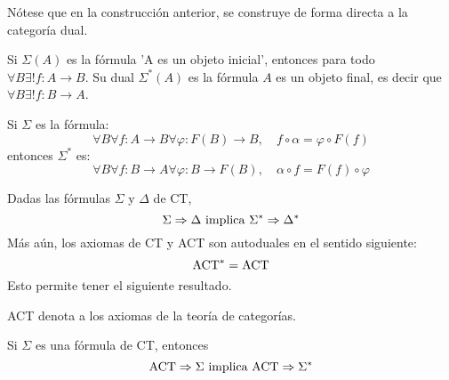 \documentclass[12pt]{report}
\theoremstyle{largebreak}
\newcommand\cf[3]{\ensuremath{#1:#2\rightarrow#3}}
\begin{document}
    \begin{obs}
        Nótese que en la construcción anterior, se construye de forma directa a la categoría dual.
    \end{obs}

    \begin{exa}
        Si $\Sigma(A)$ es la fórmula 'A es un objeto inicial', entonces para todo $\forall B\exists!\cf{f}{A}{B}$. Su dual $\Sigma^*(A)$ es la fórmula $A$ es un objeto final, es decir que $\forall B\exists!\cf{f}{B}{A}$. 
    \end{exa}

    \begin{exa}
        Si $\Sigma$ es la fórmula:
        \begin{equation*}
            \forall B\forall\cf{f}{A}{B}\forall\cf{\varphi}{F(B)}{B},\quad f\circ\alpha=\varphi\circ F(f)
        \end{equation*}
        entonces $\Sigma^*$ es:
        \begin{equation*}
            \forall B\forall \cf{f}{B}{A}\forall\cf{\varphi}{B}{F(B)},\quad\alpha\circ f=F(f)\circ\varphi
        \end{equation*}
    \end{exa}

    \begin{exa}
        Dadas las fórmulas $\Sigma$ y $\Delta$ de CT,
        \begin{equation*}
            \Sigma\Rightarrow\Delta\textup{ implica }\Sigma^*\Rightarrow\Delta^*
        \end{equation*}
        Más aún, los axiomas de CT y ACT son autoduales en el sentido siguiente:
        \begin{equation*}
            \textup{ACT}^*=\textup{ACT}
        \end{equation*}
        Esto permite tener el siguiente resultado.
    \end{exa}

    \begin{obs}
        ACT denota a los axiomas de la teoría de categorías.
    \end{obs}

    \begin{propo}
        Si $\Sigma$ es una fórmula de CT, entonces
        \begin{equation*}
            \textup{ACT}\Rightarrow\Sigma\textup{ implica }\textup{ACT}\Rightarrow\Sigma^*
        \end{equation*} 
    \end{propo}
\end{document}
